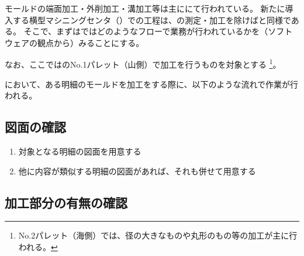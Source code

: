 



モールドの端面加工・外削加工・溝加工等は主に\MMname にて行われている。
新たに導入する横型マシニングセンタ（\DMname）での工程は、\dimple の測定・加工を除けば\MMname と同様である。
そこで、まずは\MMname ではどのようなフローで業務が行われているかを（ソフトウェアの観点から）みることにする。

なお、ここでは\MMname のNo.1パレット（山側）で加工を行うものを対象とする
\footnote{No.2パレット（海側）では、径の大きなものや丸形のもの等の加工が主に行われる。}。



\MMname において、ある明細のモールドを加工をする際に、以下のような流れで作業が行われる。


\subsection{図面の確認}
\begin{enumerate}
\item 対象となる明細の図面を用意する
\item 他に内容が類似する明細の図面があれば、それも併せて用意する
\end{enumerate}


\subsection{加工部分の有無の確認}

